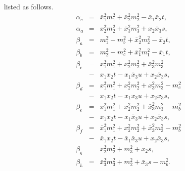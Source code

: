 \documentclass[preprint,superscriptaddress,nofootinbib]{revtex4}
\begin{document}
\begin{appendix}
  listed as follows.
   \begin{eqnarray}
  {\alpha}_{e} &=& \bar{x}_{1}^{2}m_{1}^{2}
                +  \bar{x}_{2}^{2}m_{2}^{2}
                -  \bar{x}_{1}\bar{x}_{2}t
   \label{gluon-q2-e}, \\
  {\alpha}_{a} &=& x_{2}^{2}m_{2}^{2}
                +  \bar{x}_{3}^{2}m_{3}^{2}
                +  x_{2}\bar{x}_{3}s
   \label{gluon-q2-a}, \\
  {\beta}_{a} &=& m_{1}^{2} - m_{b}^{2}
               +  \bar{x}_{2}^{2}m_{2}^{2}
               -  \bar{x}_{2}t
   \label{beta-fa}, \\
  {\beta}_{b} &=& m_{2}^{2} - m_{c}^{2}
               +  \bar{x}_{1}^{2}m_{1}^{2}
               -  \bar{x}_{1}t
   \label{beta-fb}, \\
  {\beta}_{c} &=& x_{1}^{2}m_{1}^{2}
               +  x_{2}^{2}m_{2}^{2}
               +  \bar{x}_{3}^{2}m_{3}^{2}
   \nonumber \\ &-&
                  x_{1}x_{2}t
               -  x_{1}\bar{x}_{3}u
               +  x_{2}\bar{x}_{3}s
   \label{beta-fc}, \\
  {\beta}_{d} &=& x_{1}^{2}m_{1}^{2}
               +  x_{2}^{2}m_{2}^{2}
               +  x_{3}^{2}m_{3}^{2}
               -  m_{c}^{2}
    \nonumber \\ &-&
                  x_{1}x_{2}t
               -  x_{1}x_{3}u
               +  x_{2}x_{3}s
   \label{beta-fd}, \\
  {\beta}_{e} &=& x_{1}^{2}m_{1}^{2}
               +  x_{2}^{2}m_{2}^{2}
               + \bar{x}_{3}^{2}m_{3}^{2}
               -  m_{b}^{2}
   \nonumber \\ &-&
                  x_{1}x_{2}t
               -  x_{1}\bar{x}_{3}u
               +  x_{2}\bar{x}_{3}s
   \label{beta-fe}, \\
  {\beta}_{f} &=& \bar{x}_{1}^{2}m_{1}^{2}
               +  x_{2}^{2}m_{2}^{2}
               +  \bar{x}_{3}^{2}m_{3}^{2}
               -  m_{b}^{2}
   \nonumber \\ &-&
                  \bar{x}_{1}x_{2}t
               -  \bar{x}_{1}\bar{x}_{3}u
               +  x_{2}\bar{x}_{3}s
   \label{beta-ff}, \\
  {\beta}_{g} &=& x_{2}^{2}m_{2}^{2}
               +  m_{3}^{2}
               +  x_{2}s
   \label{beta-fg}, \\
  {\beta}_{h} &=& \bar{x}_{3}^{2}m_{3}^{2}
               +  m_{2}^{2}
               +  \bar{x}_{3}s
               - m_{b}^{2}
   \label{beta-fh}.
   \end{eqnarray}


\end{appendix}
\end{document}
